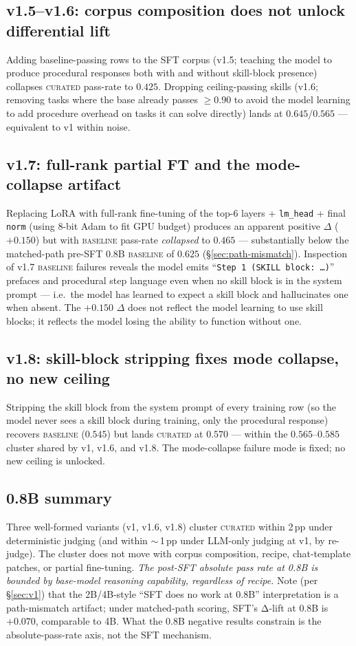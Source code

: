 \documentclass[10pt]{article}
\newcommand{\BL}{\textsc{baseline}\xspace}
\newcommand{\CU}{\textsc{curated}\xspace}
\begin{document}
\subsection{v1.5--v1.6: corpus composition does not unlock differential lift}
Adding baseline-passing rows to the SFT corpus (v1.5; teaching the model to produce procedural responses both with and without skill-block presence) collapses \CU{} pass-rate to $0.425$. Dropping ceiling-passing skills (v1.6; removing tasks where the base already passes $\geq\!0.90$ to avoid the model learning to add procedure overhead on tasks it can solve directly) lands at $0.645/0.565$ --- equivalent to v1 within noise.

\subsection{v1.7: full-rank partial FT and the mode-collapse artifact}\label{sec:v17-mode-collapse}
Replacing LoRA with full-rank fine-tuning of the top-6 layers + \texttt{lm\_head} + final \texttt{norm} (using 8-bit Adam to fit GPU budget) produces an apparent positive $\Delta$ ($+0.150$) but with \BL{} pass-rate \emph{collapsed} to $0.465$ --- substantially below the matched-path pre-SFT 0.8B \BL{} of $0.625$ (\S\ref{sec:path-mismatch}). Inspection of v1.7 \BL{} failures reveals the model emits ``\texttt{Step 1 (SKILL block: \dots)}'' prefaces and procedural step language even when no skill block is in the system prompt --- i.e.\ the model has learned to expect a skill block and hallucinates one when absent. The $+0.150$ $\Delta$ does not reflect the model learning to use skill blocks; it reflects the model losing the ability to function without one.

\subsection{v1.8: skill-block stripping fixes mode collapse, no new ceiling}
Stripping the skill block from the system prompt of every training row (so the model never sees a skill block during training, only the procedural response) recovers \BL{} ($0.545$) but lands \CU{} at $0.570$ --- within the $0.565$--$0.585$ cluster shared by v1, v1.6, and v1.8. The mode-collapse failure mode is fixed; no new ceiling is unlocked.

\subsection{0.8B summary}\label{sec:0.8b-summary}
Three well-formed variants (v1, v1.6, v1.8) cluster \CU{} within 2\,pp under deterministic judging (and within $\sim$\,1\,pp under LLM-only judging at v1, by re-judge). The cluster does not move with corpus composition, recipe, chat-template patches, or partial fine-tuning. \emph{The post-SFT absolute pass rate at 0.8B is bounded by base-model reasoning capability, regardless of recipe.} Note (per \S\ref{sec:v1}) that the 2B/4B-style ``SFT does no work at 0.8B'' interpretation is a path-mismatch artifact; under matched-path scoring, SFT's Δ-lift at 0.8B is $+0.070$, comparable to 4B. What the 0.8B negative results constrain is the absolute-pass-rate axis, not the SFT mechanism.
\end{document}
